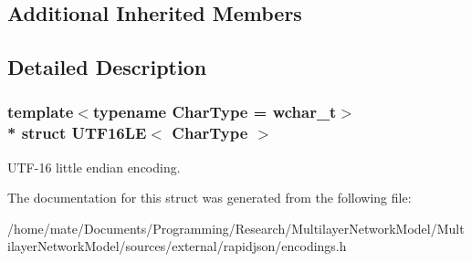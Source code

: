 \subsection*{Additional Inherited Members}


\subsection{Detailed Description}
\subsubsection*{template$<$typename Char\+Type = wchar\+\_\+t$>$\\*
struct U\+T\+F16\+L\+E$<$ Char\+Type $>$}

U\+T\+F-\/16 little endian encoding. 

The documentation for this struct was generated from the following file\+:\begin{DoxyCompactItemize}
\item 
/home/mate/\+Documents/\+Programming/\+Research/\+Multilayer\+Network\+Model/\+Multilayer\+Network\+Model/sources/external/rapidjson/encodings.\+h\end{DoxyCompactItemize}
